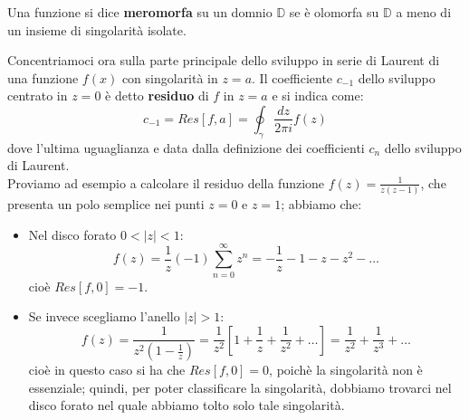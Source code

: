 \begin{definizione}
Una funzione si dice \textbf{meromorfa} su un domnio $\mathbb{D}$ se è olomorfa su $\mathbb{D}$ a meno di un insieme di singolarità isolate.
\end{definizione}
Concentriamoci ora sulla parte principale dello sviluppo in serie di Laurent di una funzione $f(x)$ con singolarità in $z=a$. Il coefficiente $c_{-1}$ dello sviluppo centrato in $z=0$ è detto \textbf{residuo} di $f$ in $z=a$ e si indica come:
$$c_{-1}=Res[f,a]=\oint_{\gamma} \frac{dz}{2 \pi i} f(z)$$
dove l'ultima uguaglianza e data dalla definizione dei coefficienti $c_n$ dello sviluppo di Laurent.
\\
Proviamo ad esempio a calcolare il residuo della funzione $f(z)=\frac{1}{z(z-1)}$, che presenta un polo semplice nei punti $z=0$ e $z=1$; abbiamo che:
\begin{itemize}
\item Nel disco forato $0<|z|<1$:
$$f(z)=\frac{1}{z} (-1) \sum_{n=0} ^{\infty} z^n = -\frac{1}{z} -1 -z-z^2- \dots$$
cioè $Res[f,0]=-1$.
\item Se invece scegliamo l'anello $|z|>1$:
$$f(z)= \frac{1}{z^2(1-\frac{1}{z})} = \frac{1}{z^2} \left[1+\frac {1}{z}+\frac{1}{z^2}+\dots \right]=\frac {1}{z^2}+\frac{1}{z^3}+\dots$$
cioè in questo caso si ha che $Res[f,0]=0$, poichè la singolarità non è essenziale; quindi, per poter classificare la singolarità, dobbiamo trovarci nel disco forato nel quale abbiamo tolto solo tale singolarità.
\end{itemize}

